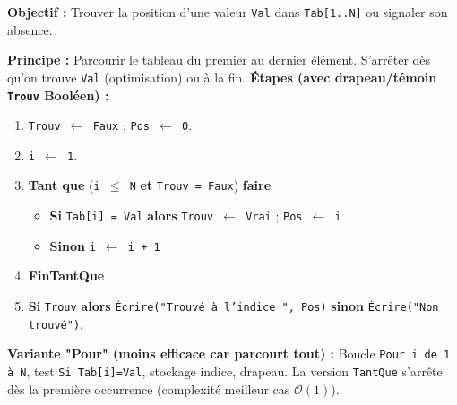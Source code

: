 \documentclass[11pt]{article}
\begin{document}
\begin{methode}
\textbf{Objectif :} Trouver la position d'une valeur \texttt{Val} dans \texttt{Tab[1..N]} ou signaler son absence.\par
\medskip
\textbf{Principe :} Parcourir le tableau du premier au dernier élément. S'arrêter dès qu'on trouve \texttt{Val} (optimisation) ou à la fin.
\medskip
\textbf{Étapes (avec drapeau/témoin \texttt{Trouv} Booléen) :}
\begin{enumerate}
    \item \texttt{Trouv $\leftarrow$ Faux} ; \texttt{Pos $\leftarrow$ 0}.
    \item \texttt{i $\leftarrow$ 1}.
    \item \textbf{Tant que} (\texttt{i $\le$ N} \textbf{et} \texttt{Trouv = Faux}) \textbf{faire}
    \begin{itemize}
        \item \textbf{Si} \texttt{Tab[i] = Val} \textbf{alors} \texttt{Trouv $\leftarrow$ Vrai} ; \texttt{Pos $\leftarrow$ i}
        \item \textbf{Sinon} \texttt{i $\leftarrow$ i + 1}
    \end{itemize}
    \item \textbf{FinTantQue}
    \item \textbf{Si} \texttt{Trouv} \textbf{alors} \texttt{Écrire("Trouvé à l'indice ", Pos)} \textbf{sinon} \texttt{Écrire("Non trouvé")}.
\end{enumerate}
\medskip
\textbf{Variante "Pour" (moins efficace car parcourt tout) :} Boucle \texttt{Pour i de 1 à N}, test \texttt{Si Tab[i]=Val}, stockage indice, drapeau. La version \texttt{TantQue} s'arrête dès la première occurrence (complexité meilleur cas $\mathcal{O}(1)$).
\end{methode}
\end{document}
